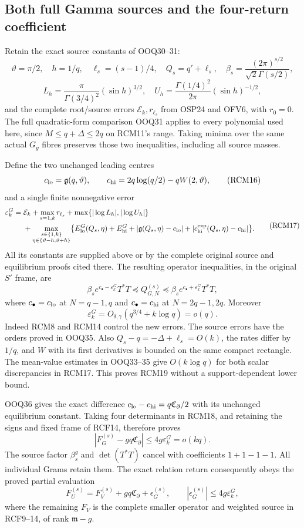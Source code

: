 \documentclass[11pt,a4paper]{article}
\begin{document}
\subsection{Both full Gamma sources and the four-return coefficient}

Retain the exact source constants of OOQ30--31:
\[
 \vartheta=\pi/2,\quad h=1/q,\quad\ell_s=(s-1)/4,\quad Q_s=q'+\ell_s,
 \quad\beta_s=\frac{(2\pi)^{s/2}}{\sqrt2\Gamma(s/2)},
\]
\[
 L_h=\frac{\pi}{\Gamma(3/4)^2}(\sin h)^{3/2},\quad
 U_h=\frac{\Gamma(1/4)^2}{2\pi}(\sin h)^{-1/2},
 \tag{RCM15}
\]
and the complete root/source errors $\mathcal E_k,r_{\ell_s}$
from OSP24 and OFV6, with $r_0=0$. The full quadratic-form
comparison OOQ31 applies to every polynomial used here,
since $M\le q+\Delta\le2q$ on RCM11's range. Taking minima
over the same actual $G_y$ fibres preserves those two
inequalities, including all source masses.

Define the two unchanged leading centres
\[
 c_{\rm lo}=\mathfrak g(q,\vartheta),\qquad
 c_{\rm hi}=2q\log(q/2)-qW(2,\vartheta),
 \tag{RCM16}
\]
and a single finite nonnegative error
\[
 \begin{split}
 \varepsilon_k^G={}&\mathcal E_k+\max_{s=1,k}r_{\ell_s}
                  +\max\{|\log L_h|,|\log U_h|\}\\
 &+\max_{\substack{s\in\{1,k\}\\\eta\in\{\vartheta-h,\vartheta+h\}}}
 \bigl\{E_{\rm lo}^G(Q_s,\eta)+E_{\rm hi}^G
       +|\mathfrak g(Q_s,\eta)-c_{\rm lo}|
       +|c_{\rm hi}^{\exp}(Q_s,\eta)-c_{\rm hi}|\bigr\}.
 \end{split}\tag{RCM17}
\]
All its constants are supplied above or by the complete
original source and equilibrium proofs cited there. The
resulting operator inequalities, in the original $S'$ frame,
are
\[
 \beta_se^{c_\bullet-\varepsilon_k^G}T^*T
 \preceq Q_{G,N}^{(s)}
 \preceq\beta_se^{c_\bullet+\varepsilon_k^G}T^*T,
 \tag{RCM18}
\]
where $c_\bullet=c_{\rm lo}$ at $N=q-1,q$ and
$c_\bullet=c_{\rm hi}$ at $N=2q-1,2q$.
Moreover
\[
 \varepsilon_k^G=O_{\delta,\gamma}(q^{3/4}+k\log q)=o(q).
 \tag{RCM19}
\]
Indeed RCM8 and RCM14 control the new errors. The source
errors have the orders proved in OOQ35. Also
$Q_s-q=-\Delta+\ell_s=O(k)$, the rates differ by $1/q$,
and $W$ with its first derivatives is bounded on the same
compact rectangle. The mean-value estimates in OOQ33--35
give $O(k\log q)$ for both scalar discrepancies in RCM17.
This proves RCM19 without a support-dependent lower bound.

OOQ36 gives the exact difference
$c_{\rm lo}-c_{\rm hi}=q\mathfrak C_\partial/2$ with its
unchanged equilibrium constant. Taking four determinants
in RCM18, and retaining the signs and fixed frame of RCF14,
therefore proves
\[
 |F_G^{(s)}-gq\mathfrak C_\partial|
               \le4g\varepsilon_k^G=o(kq).
 \tag{RCM20}
\]
The source factor $\beta_s^g$ and $\det(T^*T)$ cancel with
coefficients $1+1-1-1$. All individual Grams retain them.
The exact relation return consequently obeys the proved
partial evaluation
\[
 F_U^{(s)}=F_V^{(s)}+gq\mathfrak C_\partial+\epsilon_G^{(s)},
       \qquad |\epsilon_G^{(s)}|\le4g\varepsilon_k^G,
 \tag{RCM21}
\]
where the remaining $F_V$ is the complete smaller operator
and weighted source in RCF9--14, of rank $\mathfrak m-g$.
\end{document}
